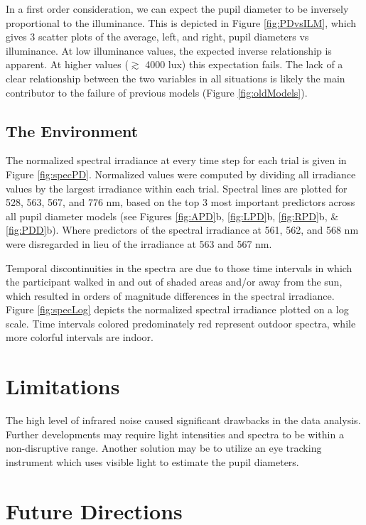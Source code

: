 \documentclass[10pt]{article}
\begin{document}
In a first order consideration, we can expect the pupil diameter to be inversely proportional to the illuminance. This is depicted in Figure \ref{fig:PDvsILM}, which gives 3 scatter plots of the average, left, and right, pupil diameters vs illuminance. At low illuminance values, the expected inverse relationship is apparent. At higher values ($\gtrsim$ 4000 lux) this expectation fails. The lack of a clear relationship between the two variables in all situations is likely the main contributor to the failure of previous models (Figure \ref{fig:oldModels}). 

\subsection{The Environment}

The normalized spectral irradiance at every time step for each trial is given in Figure \ref{fig:specPD}. Normalized values were computed by dividing all irradiance values by the largest irradiance within each trial. Spectral lines are plotted for 528, 563, 567, and 776 nm, based on the top 3 most important predictors across all pupil diameter models (see Figures \ref{fig:APD}b, \ref{fig:LPD}b, \ref{fig:RPD}b, \& \ref{fig:PDD}b). Where predictors of the spectral irradiance at 561, 562, and 568 nm were disregarded in lieu of the irradiance at 563 and 567 nm. 

Temporal discontinuities in the spectra are due to those time intervals in which the participant walked in and out of shaded areas and/or away from the sun, which resulted in orders of magnitude differences in the spectral irradiance. Figure \ref{fig:specLog} depicts the normalized spectral irradiance plotted on a log scale. Time intervals colored predominately red represent outdoor spectra, while more colorful intervals are indoor.

\section{Limitations}

The high level of infrared noise caused significant drawbacks in the data analysis. Further developments may require light intensities and spectra to be within a non-disruptive range. Another solution may be to utilize an eye tracking instrument which uses visible light to estimate the pupil diameters.

\section{Future Directions}
\end{document}
